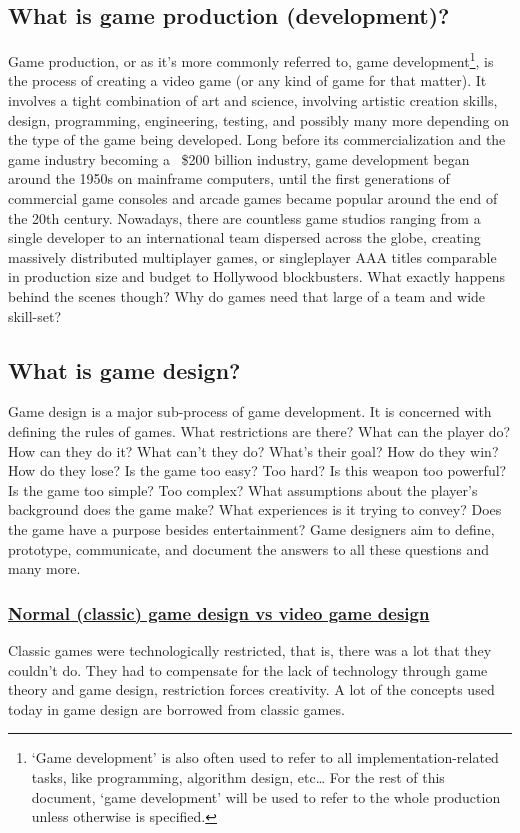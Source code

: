 \documentclass[../main.tex]{subfiles}
\begin{document}
\subsection{What is game production (development)?}
Game production, or as it’s more commonly referred to, game development\footnote{‘Game development’ is also often used to refer to all implementation-related tasks, like programming, algorithm design, etc… For the rest of this document, ‘game development’ will be used to refer to the whole production unless otherwise is specified.}, is the process of creating a video game (or any kind of game for that matter). It involves a tight combination of art and science, involving artistic creation skills, design, programming, engineering, testing, and possibly many more depending on the type of the game being developed. Long before its commercialization and the game industry becoming a ~\$200 billion industry, game development began around the 1950s on mainframe computers, until the first generations of commercial game consoles and arcade games became popular around the end of the 20th century. Nowadays, there are countless game studios ranging from a single developer to an international team dispersed across the globe, creating massively distributed multiplayer games, or singleplayer AAA titles comparable in production size and budget to Hollywood blockbusters. What exactly happens behind the scenes though? Why do games need that large of a team and wide skill-set?

\subsection{What is game design?}
Game design is a major sub-process of game development. It is concerned with defining the rules of games. What restrictions are there? What can the player do? How can they do it? What can't they do? What's their goal? How do they win? How do they lose? Is the game too easy? Too hard? Is this weapon too powerful? Is the game too simple? Too complex? What assumptions about the player's background does the game make? What experiences is it trying to convey? Does the game have a purpose besides entertainment? Game designers aim to define, prototype, communicate, and document the answers to all these questions and many more.
\subsubsection*{\underline{Normal (classic) game design vs video game design}}
Classic games were technologically restricted, that is, there was a lot that they couldn't do. They had to compensate for the lack of technology through game theory and game design, restriction forces creativity. A lot of the concepts used today in game design are borrowed from classic games. 
\end{document}
